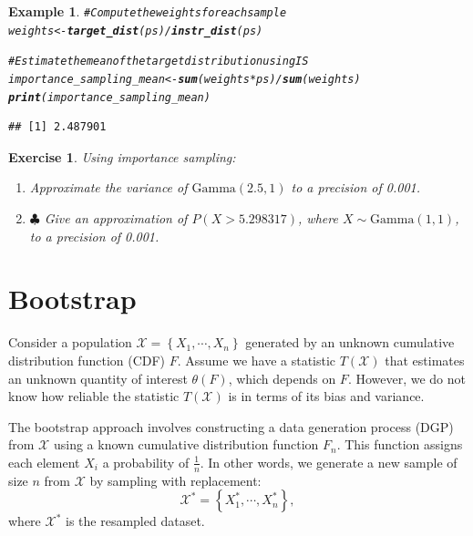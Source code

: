 \documentclass{article}\usepackage[]{graphicx}\usepackage[]{xcolor}
\makeatletter
\newcommand{\hlcom}[1]{\textcolor[rgb]{0.678,0.584,0.686}{\textit{#1}}}%
\newcommand{\hlopt}[1]{\textcolor[rgb]{0,0,0}{#1}}%
\newcommand{\hldef}[1]{\textcolor[rgb]{0.345,0.345,0.345}{#1}}%
\newcommand{\hlkwb}[1]{\textcolor[rgb]{0.69,0.353,0.396}{#1}}%
\newcommand{\hlkwd}[1]{\textcolor[rgb]{0.737,0.353,0.396}{\textbf{#1}}}%
\newenvironment{kframe}{%
 \def\at@end@of@kframe{}%
 \ifinner\ifhmode%
  \def\at@end@of@kframe{\end{minipage}}%
  \begin{minipage}{\columnwidth}%
 \fi\fi%
 \def\FrameCommand##1{\hskip\@totalleftmargin \hskip-\fboxsep
 \colorbox{shadecolor}{##1}\hskip-\fboxsep
     \hskip-\linewidth \hskip-\@totalleftmargin \hskip\columnwidth}%
 \MakeFramed {\advance\hsize-\width
   \@totalleftmargin\z@ \linewidth\hsize
   \@setminipage}}%
 {\par\unskip\endMakeFramed%
 \at@end@of@kframe}
\newenvironment{knitrout}{}{} %
\newtheorem{exercise}{Exercise}
\newtheorem{example}{Example}
\makeatother
\begin{document}
\begin{example}
\begin{knitrout}
\begin{kframe}
\begin{alltt}
\hlcom{# Compute the weights for each sample}
\hldef{weights} \hlkwb{<-} \hlkwd{target_dist}\hldef{(ps)} \hlopt{/} \hlkwd{instr_dist}\hldef{(ps)}

\hlcom{# Estimate the mean of the target distribution using IS}
\hldef{importance_sampling_mean} \hlkwb{<-} \hlkwd{sum}\hldef{(weights} \hlopt{*} \hldef{ps)} \hlopt{/} \hlkwd{sum}\hldef{(weights)}
\hlkwd{print}\hldef{(importance_sampling_mean)}
\end{alltt}
\begin{verbatim}
## [1] 2.487901
\end{verbatim}
\end{kframe}
\end{knitrout}

\end{example}

\begin{exercise}
Using importance sampling:
\begin{enumerate}
    \item Approximate the variance of $\text{Gamma}(2.5, 1)$ to a precision of 0.001.
    \item $\clubsuit$ Give an approximation of $P(X > 5.298317)$, where $X \sim \text{Gamma}(1, 1)$, to a precision of 0.001.
\end{enumerate}
\end{exercise}




\newpage
\section{Bootstrap}


Consider a population $\mathcal{X} = \left\lbrace X_1, \cdots, X_n \right\rbrace$ generated by an unknown cumulative distribution function (CDF) $F$. Assume we have a statistic $T(\mathcal{X})$ that estimates an unknown quantity of interest $\theta(F)$, which depends on $F$. However, we do not know how reliable the statistic $T(\mathcal{X})$ is in terms of its bias and variance.

The bootstrap approach involves constructing a data generation process (DGP) from $\mathcal{X}$ using a known cumulative distribution function $F_n$. This function assigns each element $X_i$ a probability of $\frac{1}{n}$. In other words, we generate a new sample of size $n$ from $\mathcal{X}$ by sampling with replacement:
\begin{equation}\label{Bootstrap world DGP}
\mathcal{X}^* = \left\lbrace X_1^*, \cdots, X_n^* \right\rbrace,
\end{equation}
where $\mathcal{X}^*$ is the resampled dataset. 
\end{document}
